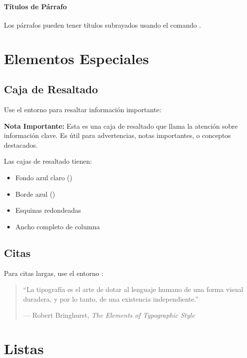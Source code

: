 \documentclass{pt-article}
\begin{document}
\paragraph{Títulos de Párrafo}

Los párrafos pueden tener títulos subrayados usando el comando
.

\section{Elementos Especiales}

\subsection{Caja de Resaltado}

Use el entorno  para resaltar información importante:

\begin{highlightbox}
\textbf{Nota Importante:} Esta es una caja de resaltado que llama la atención
sobre información clave. Es útil para advertencias, notas importantes, o
conceptos destacados.
\end{highlightbox}

Las cajas de resaltado tienen:
\begin{itemize}
    \item Fondo azul claro ()
    \item Borde azul ()
    \item Esquinas redondeadas
    \item Ancho completo de columna
\end{itemize}

\subsection{Citas}

Para citas largas, use el entorno :

\begin{quotation}
``La tipografía es el arte de dotar al lenguaje humano de una forma visual
duradera, y por lo tanto, de una existencia independiente.''

--- Robert Bringhurst, \textit{The Elements of Typographic Style}
\end{quotation}

\section{Listas}
\end{document}
